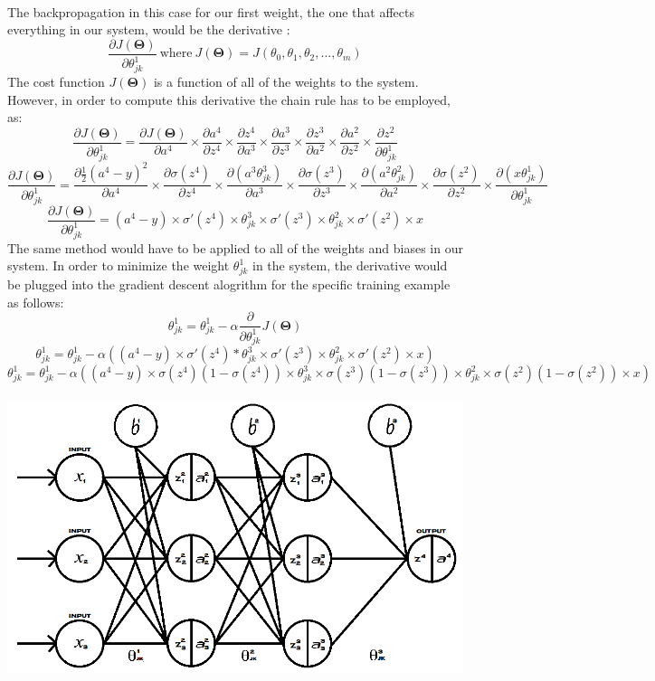 \documentclass[a4paper,12pt]{article}
\begin{document}
\\ The backpropagation in this case for our first weight, the one that affects everything in our system, would be the derivative \cite{backpropagation}:
\[\frac{\partial J(\boldsymbol{\Theta})}{\partial \theta_{jk}^1} \ \text{where} \ J(\boldsymbol{\Theta}) = J(\theta_0, \theta_1, \theta_2,...,\theta_m)\] 
The cost function $J(\boldsymbol{\Theta})$ is a function of all of the weights to the system. However, in order to compute this derivative the chain rule has to be employed, as:
\[\frac{\partial J(\boldsymbol{\Theta})}{\partial \theta_{jk}^1} = \frac{\partial J(\boldsymbol{\Theta})}{\partial a^4} \times \frac{\partial a^4}{\partial z^4} \times \frac{\partial z^4}{\partial a^3} \times \frac{\partial a^3}{\partial z^3} \times \frac{\partial z^3}{\partial a^2} \times \frac{\partial a^2}{\partial z^2} \times \frac{\partial z^2}{\partial \theta^1_{jk}}\]
\[\frac{\partial J(\boldsymbol{\Theta})}{\partial \theta_{jk}^1} = \frac{\partial \frac{1}{2}(a^4 - y)^2}{\partial a^4} \times \frac{\partial \sigma(z^4)}{\partial z^4} \times \frac{\partial (a^3\theta^3_{jk})}{\partial a^3} \times \frac{\partial \sigma(z^3)}{\partial z^3} \times \frac{\partial (a^2\theta_{jk}^2)}{\partial a^2} \times \frac{\partial \sigma(z^2)}{\partial z^2} \times \frac{\partial (x\theta_{jk}^1)}{\partial \theta_{jk}^1}\]
\[\frac{\partial J(\boldsymbol{\Theta})}{\partial \theta_{jk}^1} = (a^4 - y) \times \sigma'(z^4) \times \theta_{jk}^3 \times \sigma'(z^3) \times \theta_{jk}^2 \times \sigma'(z^2) \times x\]
The same method would have to be applied to all of the weights and biases in our system. In order to minimize the weight $\theta_{jk}^1$ in the system, the derivative would be plugged into the gradient descent alogrithm for the specific training example as follows:
 \[\theta_{jk}^1 = \theta_{jk}^1 - \alpha \frac{\partial}{\partial\theta_{jk}^1} J(\boldsymbol{\Theta})\]
\[\theta_{jk}^1 = \theta_{jk}^1 - \alpha ((a^4 - y) \times \sigma'(z^4) * \theta_{jk}^3 \times \sigma'(z^3) \times \theta_{jk}^2 \times \sigma'(z^2) \times x)\]
\[\theta_{jk}^1 = \theta_{jk}^1 - \alpha ((a^4 - y) \times \sigma(z^4)(1-\sigma(z^4)) \times \theta_{jk}^3 \times \sigma(z^3)(1-\sigma(z^3)) \times \theta_{jk}^2 \times \sigma(z^2)(1-\sigma(z^2)) \times x)\]
\\
\includegraphics[scale=0.548]{multidimension}
\end{document}
